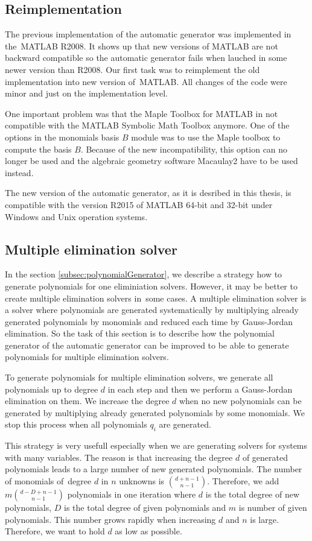 \subsection{Reimplementation}
The previous implementation \cite{AutoGen} of the automatic generator was implemented in the~MATLAB R2008. It shows up that new versions of MATLAB are not backward compatible so the automatic generator fails when lauched in some newer version than R2008. Our first task was to reimplement the old implementation into new version of~MATLAB. All changes of the code were minor and just on the implementation level.

One important problem was that the Maple Toolbox for MATLAB in not compatible with the MATLAB Symbolic Math Toolbox anymore. One of the options in the monomials basis $B$ module was to use the Maple toolbox to compute the basis $B$. Because of the new incompatibility, this option can no longer be used and the algebraic geometry software Macaulay2 \cite{M2} have to be used instead.

The new version of the automatic generator, as it is desribed in this thesis, is compatible with the version R2015 of MATLAB 64-bit and 32-bit under Windows and Unix operation systems.

\subsection{Multiple elimination solver}
\label{subsec:multipleSolver}
In the section \ref{subsec:polynomialGenerator}, we describe a strategy how to generate polynomials for one eliminiation solvers. However, it may be better to create multiple elimination solvers in~some cases. A multiple elimination solver is a solver where polynomials are generated systematically by multiplying already generated polynomials by monomials and reduced each time by Gauss-Jordan elimination. So the task of this section is to describe how the polynomial generator of the automatic generator can be improved to be able to generate polynomials for multiple elimination solvers.

To generate polynomials for multiple elimination solvers, we generate all polynomials up to degree $d$ in each step and then we perform a Gauss-Jordan elimination on them. We increase the degree $d$ when no new polynomials can be generated by multiplying already generated polynomials by some monomials. We stop this process when all polynomials $q_i$ are generated. 

This strategy is very usefull especially when we are generating solvers for systems with many variables. The reason is that increasing the degree $d$ of generated polynomials leads to a large number of new generated polynomials. The number of monomials of~degree $d$ in $n$ unknowns is ${d + n - 1 \choose n - 1}$. Therefore, we add $m{d - D + n - 1 \choose n - 1}$ polynomials in one iteration where $d$ is the total degree of new polynomials, $D$ is the total degree of given polynomials and $m$ is number of given polynomials. This number grows rapidly when increasing $d$ and $n$ is large. Therefore, we want to hold $d$ as low as possible.

